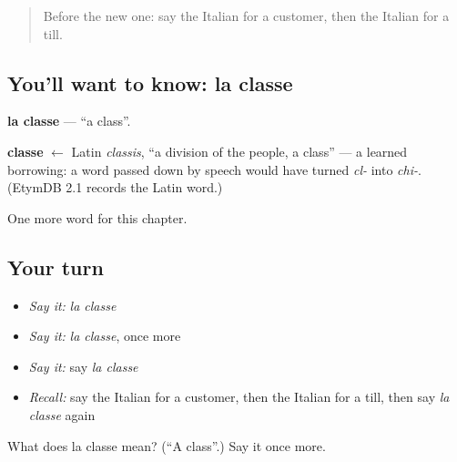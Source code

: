 \label{lesson:IT-C113-classe}



\begin{quote}
Before the new one: say the Italian for a customer, then the Italian for a till.
\end{quote}

\subsection*{You'll want to know: la classe}
\textbf{la classe} — \textquotedblleft{}a class\textquotedblright{}.

\begin{cousinweb}
\textbf{classe} $\leftarrow$ Latin \emph{classis}, \textquotedblleft{}a division of the people, a class\textquotedblright{} — a learned borrowing: a word passed down by speech would have turned \emph{cl-} into \emph{chi-}. (EtymDB 2.1 records the Latin word.)
\end{cousinweb}

\begin{grammarlens}[title={What you've built}]
One more word for this chapter.
\end{grammarlens}

\subsection*{Your turn}
\begin{itemize}
\raggedright
  \item \emph{Say it:} \emph{la classe}
  \item \emph{Say it:} \emph{la classe}, once more
  \item \emph{Say it:} say \emph{la classe}
  \item \emph{Recall:} say the Italian for a customer, then the Italian for a till, then say \emph{la classe} again
\end{itemize}

\begin{tcolorbox}[breakable,colback=teal!4,colframe=teal!35!black,title={Before you move on}]
What does la classe mean? (\textquotedblleft{}A class\textquotedblright{}.) Say it once more.
\end{tcolorbox}
